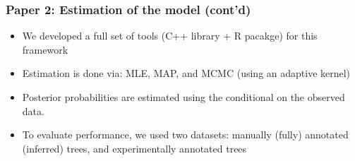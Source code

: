 \documentclass[aspectratio=169, 10pt]{beamer}
\begin{document}
\begin{frame}[label=aphylo]
\frametitle{Paper 2: Estimation of the model (cont'd)}
\begin{itemize}
\item We developed a full set of tools (C++ library + R pacakge) for this framework
\hyperlink{aphylopkg}{}
\item Estimation is done via: MLE, MAP, and MCMC (using an adaptive kernel)
\item Posterior probabilities are estimated using the conditional on the observed data.
\item To evaluate performance, we used two datasets: manually (fully) annotated (inferred) trees, and experimentally annotated trees
\end{itemize}
\end{frame}
\end{document}

